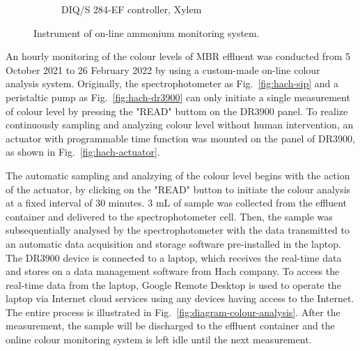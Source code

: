 \begin{figure}[h]
\begin{subfigure}{0.3\textwidth}
      \caption{DIQ/S 284-EF controller, Xylem} \label{fig:nh3-sensor-b}
    \end{subfigure}%
  \caption{Instrument of on-line ammonium monitoring system.} \label{fig:nh3-sensor}
\end{figure}

An hourly monitoring of the colour levels of MBR effluent was conducted from 5 October 2021 to 26 February 2022 by using a custom-made on-line colour analysis system. Originally, the spectrophotometer as Fig.~\ref{fig:hach-sip} and a peristaltic pump as Fig.~\ref{fig:hach-dr3900} can only initiate a single measurement of colour level by pressing the "READ" buttom on the DR3900 panel. To realize continuously sampling and analyzing colour level without human intervention, an actuator with programmable time function was mounted on the panel of DR3900, as shown in Fig.~\ref{fig:hach-actuator}. 

The automatic sampling and analzying of the colour level begins with the action of the actuator, by clicking on the "READ" button to initiate the colour analysis at a fixed interval of 30 minutes. 3 mL of sample was collected from the effluent container and delivered to the spectrophotometer cell. Then, the sample was subsequentially analysed by the spectrophotometer with the data transmitted to an automatic data acquisition and storage software pre-installed in the laptop. The DR3900 device is connected to a laptop, which receives the real-time data and stores on a data management software from Hach company. To access the real-time data from the laptop, Google Remote Desktop is used to operate the laptop via Internet cloud services using any devices having access to the Internet. The entire process is illustrated in Fig.~\ref{fig:diagram-colour-analysis}. After the measurement, the sample will be discharged to the effluent container and the online colour monitoring system is left idle until the next measurement. 

